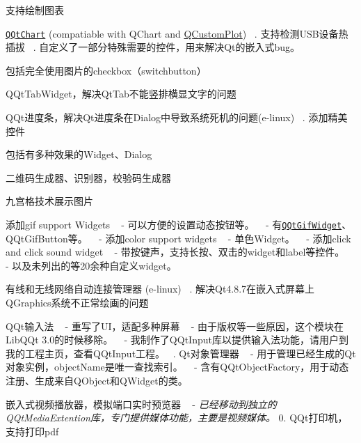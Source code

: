 \begin{DoxyEnumerate}
\item 支持绘制图表
\begin{DoxyItemize}
\item \href{src/charts/qqtchartview.h}{\tt Q\+Qt\+Chart} (compatiable with Q\+Chart and \mbox{\hyperlink{class_q_custom_plot}{Q\+Custom\+Plot}}) ~. 支持检测\+U\+S\+B设备热插拔 ~. 自定义了一部分特殊需要的控件，用来解决\+Qt的嵌入式bug。
\item 包括完全使用图片的checkbox（switchbutton）
\item Q\+Qt\+Tab\+Widget，解决\+Qt\+Tab不能竖排横显文字的问题
\item Q\+Qt进度条，解决\+Qt进度条在\+Dialog中导致系统死机的问题(e-\/linux) ~. 添加精美控件
\item 包括有多种效果的\+Widget、\+Dialog
\item 二维码生成器、识别器，校验码生成器
\item 九宫格技术展示图片
\item 添加gif support Widgets ~\newline
 -\/ 可以方便的设置动态按钮等。 ~\newline
 -\/ 有\href{src/exquisite/gifwidgets/qqtgifwidget.h}{\tt Q\+Qt\+Gif\+Widget}、\+Q\+Qt\+Gif\+Button等。 ~\newline
 -\/ 添加color support widgets ~\newline
 -\/ 单色\+Widget。 ~\newline
 -\/ 添加click and click sound widget ~\newline
 -\/ 带按键声，支持长按、双击的widget和label等控件。 ~\newline
 -\/ 以及未列出的等20余种自定义widget。
\end{DoxyItemize}
\item 有线和无线网络自动连接管理器 (e-\/linux) ~. 解决\+Qt4.8.\+7在嵌入式屏幕上\+Q\+Graphics系统不正常绘画的问题
\item Q\+Qt输入法 ~\newline
 -\/ 重写了\+U\+I，适配多种屏幕 ~\newline
 -\/ 由于版权等一些原因，这个模块在\+Lib\+Q\+Qt 3.\+0的时候移除。 ~\newline
 -\/ 我制作了\+Q\+Qt\+Input库以提供输入法功能，请用户到我的工程主页，查看\+Q\+Qt\+Input工程。 ~. Qt对象管理器 ~\newline
 -\/ 用于管理已经生成的\+Qt对象实例，object\+Name是唯一查找索引。 ~\newline
 -\/ 含有\+Q\+Qt\+Object\+Factory，用于动态注册、生成来自\+Q\+Object和\+Q\+Widget的类。
\item 嵌入式视频播放器，模拟端口实时预览器 ~\newline
 -\/ {\itshape 已经移动到独立的\+Q\+Qt\+Media\+Extention库，专门提供媒体功能，主要是视频媒体。} 0. Q\+Qt打印机，支持打印pdf
\end{DoxyEnumerate}

